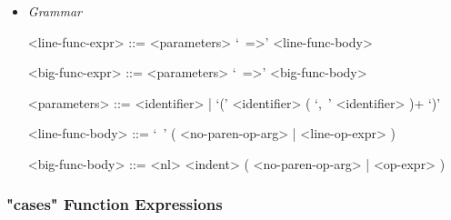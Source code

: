 \documentclass{article}
\begin{document}
\begin{itemize}
\item \textit{Grammar}
\begin{grammar}
<line-func-expr> ::= <parameters> `\ =>' <line-func-body>

<big-func-expr> ::= <parameters> `\ =>' <big-func-body>

<parameters> ::= <identifier> | `(' <identifier> ( `,\ ' <identifier> )+ `)'

<line-func-body> ::= `\ ' ( <no-paren-op-arg> | <line-op-expr> )

<big-func-body> ::= <nl> <indent> ( <no-paren-op-arg> | <op-expr> )
\end{grammar}
\end{itemize}

\subsubsection{"cases" Function Expressions}
\label{subsubsec:casessyntax}
\end{document}
